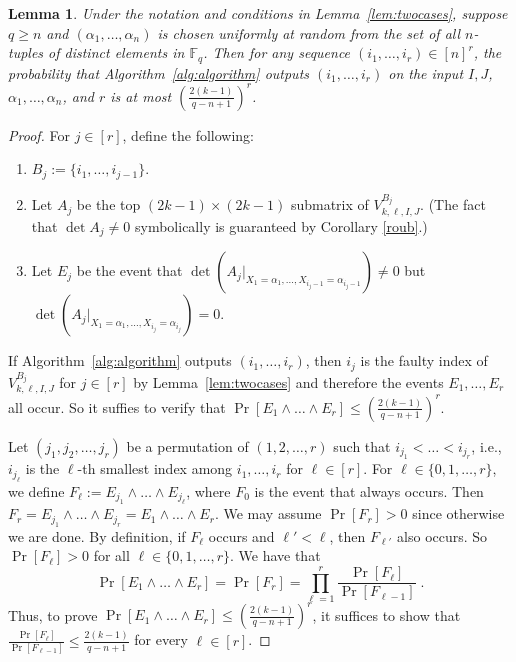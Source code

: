 \documentclass[11pt]{article}
\theoremstyle{plain}
\newtheorem{lemma}[thm]{Lemma}
\theoremstyle{definition}
\theoremstyle{remark}
\newcommand{\F}{\mathbb{F}}
\begin{document}
\begin{lemma}\label{CGLZ24}\label{lem:certprob}
Under the notation and conditions in Lemma~\ref{lem:twocases}, suppose $q\geq n$ and $(\alpha_1,\dots,\alpha_n)$ is chosen uniformly at random from the set of all $n$-tuples of distinct elements in $\F_q$. Then for any sequence $(i_1,\dots,i_r)\in [n]^r$, the probability that Algorithm~\ref{alg:algorithm} outputs $(i_1,\dots,i_r)$ on the input $I,J$, $\alpha_1,\dots,\alpha_n$, and $r$ is at most $\left(\frac{2(k-1)}{q-n+1}\right)^r$.
\end{lemma}
\begin{proof}
For $j\in [r]$, define the following:
\begin{enumerate}
\item $B_j:=\{i_1,\dots,i_{j-1}\}$.
\item Let $A_j$ be the top 
$(2k-1)\times (2k-1)$ submatrix of $V_{k,\ell, I,J}^{B_j}$. (The fact that $\det A_j\neq 0$ symbolically is guaranteed by Corollary \ref{roub}.)
\item Let $E_j$ be the event that $\det(A_j|_{X_1=\alpha_1,\dots,X_{i_j-1}=\alpha_{i_j-1}})\neq 0$ but $\det(A_j|_{X_1=\alpha_1,\dots,X_{i_j}=\alpha_{i_j}})=0$. 
\end{enumerate}
If Algorithm~\ref{alg:algorithm} outputs $(i_1,\dots,i_r)$, then $i_j$ is the faulty index of $V_{k,\ell, I,J}^{B_j}$ for $j\in [r]$ by Lemma~\ref{lem:twocases} and therefore the events $E_1,\dots,E_r$ all occur. So it suffies to verify that $\Pr[E_1\wedge\dots \wedge E_r]\leq \left(\frac{2(k-1)}{q-n+1}\right)^r$.

Let $(j_1, j_2,\dots,j_r)$ be a permutation of $(1,2,\dots,r)$ such that $i_{j_1}<\dots<i_{j_r}$, i.e., $i_{j_\ell}$ is the $\ell$-th smallest index among $i_1,\dots,i_r$ for $\ell\in [r]$. 
For $\ell\in\{0,1,\dots,r\}$, we define $F_\ell:=E_{j_1}\wedge \dots \wedge E_{j_\ell}$, where $F_0$ is the event that always occurs. 
Then $F_r=E_{j_1}\wedge \dots \wedge E_{j_r}=E_1\wedge\dots \wedge E_r$. We may assume $\Pr[F_r]>0$ since otherwise we are done. By definition, if $F_{\ell}$ occurs and $\ell'<\ell$, then $F_{\ell'}$ also occurs. So $\Pr[F_\ell]>0$ for all $\ell\in\{0,1,\dots,r\}$.
We have that
\[
\Pr[E_1\wedge\dots \wedge E_r]=\Pr[F_r]=\prod_{\ell=1}^r \frac{\Pr[F_\ell]}{\Pr[F_{\ell-1}]}\;.
\]
Thus, to prove $\Pr[E_1\wedge\dots \wedge E_r]\leq \left(\frac{2(k-1)}{q-n+1}\right)^r$, it suffices to show that $\frac{\Pr[F_\ell]}{\Pr[F_{\ell-1}]}\leq \frac{2(k-1)}{q-n+1}$ for every $\ell\in[r]$.


\end{proof}
\end{document}

